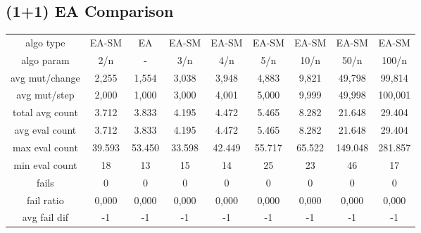 \subsection{(1+1) EA Comparison}
\begin{tabular}[h]{ccccccccc}
algo type&          EA-SM&      EA&   EA-SM&   EA-SM&   EA-SM&   EA-SM&   EA-SM&   EA-SM\\
algo param&           2/n&       -&     3/n&     4/n&     5/n&    10/n&    50/n&   100/n\\
avg mut/change&     2,255&   1,554&   3,038&   3,948&   4,883&   9,821&  49,798&  99,814\\
avg mut/step&       2,000&   1,000&   3,000&   4,001&   5,000&   9,999&  49,998& 100,001\\
\hline
total avg count&    3.712&   3.833&   4.195&   4.472&   5.465&   8.282&  21.648&  29.404\\
avg eval count&     3.712&   3.833&   4.195&   4.472&   5.465&   8.282&  21.648&  29.404\\
max eval count&    39.593&  53.450&  33.598&  42.449&  55.717&  65.522& 149.048& 281.857\\
min eval count&        18&      13&      15&      14&      25&      23&      46&      17\\
\hline
fails&                  0&       0&       0&       0&       0&       0&       0&       0\\
fail ratio&         0,000&   0,000&   0,000&   0,000&   0,000&   0,000&   0,000&   0,000\\
avg fail dif&          -1&      -1&      -1&      -1&      -1&      -1&      -1&      -1\\
\end{tabular}

